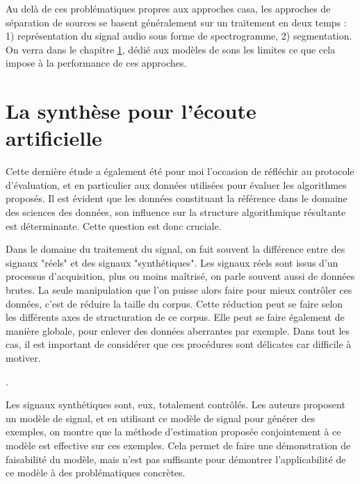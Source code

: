 Au delà de ces problématiques propres aux approches casa, les approches de séparation de sources se basent généralement sur un traitement en deux temps : 1) représentation du signal audio sous forme de spectrogramme, 2) segmentation. On verra dans le chapitre \ref{}, dédié aux modèles de sons les limites ce que cela impose à la performance de ces approches.

\section{La synthèse pour l'écoute artificielle}

Cette dernière étude a également été pour moi l'occasion de réfléchir au protocole d'évaluation, et en particulier aux données utilisées pour évaluer les algorithmes proposés. Il est évident que les données constituant la référence dans le domaine des sciences des données, son influence sur la structure algorithmique résultante est déterminante. Cette question est donc cruciale.

Dans le domaine du traitement du signal, on fait souvent la différence entre des signaux "réels" et des signaux "synthétiques". Les signaux réels sont issus d'un processus d'acquisition, plus ou moins maîtrisé, on parle souvent aussi de données brutes. La seule manipulation que l'on puisse alors faire pour mieux contrôler ces données, c'est de réduire la taille du corpus. Cette réduction peut se faire selon les différents axes de structuration de ce corpus. Elle peut se faire également de manière globale, pour enlever des données aberrantes par exemple. Dans tout les cas, il est important de considérer que ces procédures sont délicates car difficile à motiver.

.


Les signaux synthétiques sont, eux, totalement contrôlés. Les auteurs proposent un modèle de signal, et en utilisant ce modèle de signal pour générer des exemples, on montre que la méthode d'estimation proposée conjointement à ce modèle est effective sur ces exemples. Cela permet de faire une démonstration de faisabilité du modèle, mais n'est pas suffisante pour démontrer l'applicabilité de ce modèle à des problématiques concrètes.

